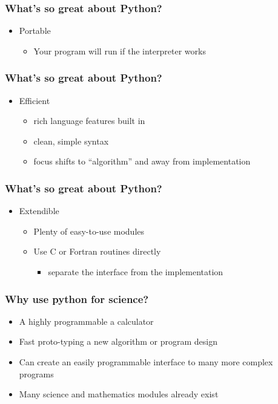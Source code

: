 \documentclass[xcolor=table,10pt,final]{beamer}
\begin{document}
\begin{frame}
  \frametitle{What's so great about Python?}
  \begin{itemize}
    \item Portable
      \begin{itemize}
        \item Your program will run if the interpreter works
      \end{itemize}
  \end{itemize}
\end{frame}
\begin{frame}
  \frametitle{What's so great about Python?}
  \begin{itemize}
    \item Efficient
      \begin{itemize}
        \item rich language features built in
        \item clean, simple syntax
        \item focus shifts to ``algorithm'' and away from implementation
      \end{itemize}
  \end{itemize}
\end{frame}
\begin{frame}
  \frametitle{What's so great about Python?}
  \begin{itemize}
    \item Extendible
      \begin{itemize}
        \item Plenty of easy-to-use modules
        \item Use C or Fortran routines directly
          \begin{itemize}
            \item separate the interface from the implementation
          \end{itemize}
      \end{itemize}
  \end{itemize}
\end{frame}

\begin{frame}
  \frametitle{Why use python for science?}
  \begin{itemize}
    \item A highly programmable a calculator
    \item Fast proto-typing a new algorithm or program design
    \item Can create an easily programmable interface to many more complex programs
    \item Many science and mathematics modules already exist
  \end{itemize}
\end{frame}
\end{document}
